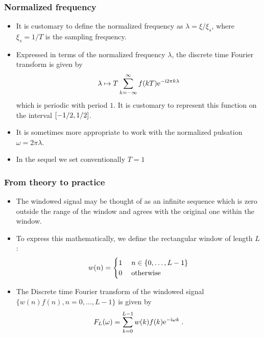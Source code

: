 \begin{frame}
\frametitle{Normalized frequency}
\begin{itemize}
\item It is customary to define the \alert{normalized} frequency as \alert{$ \lambda = \xi/ \xi_s$}, where \alert{$\xi_s= 1/T$} is the sampling frequency.
\item Expressed in terms of the normalized frequency $\lambda$, the discrete time Fourier transform is given by
\[
\lambda \mapsto T \sum_{k=-\infty}^{\infty} f(kT) \mathrm{e}^{- \mathrm{i} 2 \pi k \lambda}
\]
which is periodic with period $1$. It is customary to represent this function on the interval $\left[-1/2,1/2\right]$.
\item It is sometimes more appropriate to work with the \alert{normalized pulsation} \alert{$\omega= 2 \pi \lambda$}.
\item In the sequel we set conventionally $T=1$
\end{itemize}
\end{frame}

\begin{frame}
\frametitle{From theory to practice}
\begin{itemize}
\item The windowed signal may be thought of as an \alert{infinite sequence} which is zero outside the range of the window and agrees with the original one within the window.
\item To express this mathematically, we define the \alert{rectangular} window of length $L$:
\[
w(n) =
\begin{cases}
1 \; & n \in \{0,\dots,L-1\} \\
0 &  \text{otherwise}
\end{cases}
\]
\item The Discrete time Fourier transform of the windowed signal $\{ w(n) f(n), n=0,\dots,L-1\}$ is given by
\[
F_L(\omega)= \sum_{k=0}^{L-1} w(k) f(k) \mathrm{e}^{-\mathrm{i} \omega k} \;.
\]
\end{itemize}
\end{frame}

